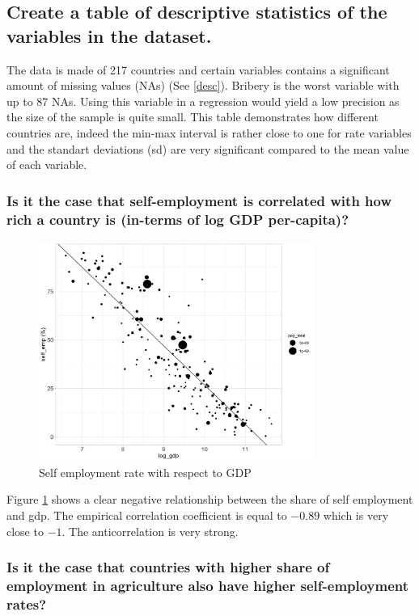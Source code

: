 \subsection{Create a table of descriptive statistics of the variables in the dataset.}


The data is made of 217 countries and certain variables contains a significant
amount of missing values (NAs) (See \ref{desc}). Bribery is the worst variable with up to 87 NAs. Using
this variable in a regression would yield a low precision as the size of the sample is quite small.
This table demonstrates how different countries are, indeed the min-max interval is rather close to one for rate variables and the standart deviations (sd)
are very significant compared to the mean value of each variable.

\subsubsection{Is it the case that self-employment is correlated with how rich a country is (in-terms of log GDP per-capita)?}


\begin{figure}[htbp]
  \centering
  \includegraphics[width=0.8\textwidth]{Exercise_1/OUTPUT/emp_wrt_gdp.png}
  \caption{Self employment rate with respect to GDP}
  \label{fig:emp_gdp}
\end{figure}


Figure \ref{fig:emp_gdp} shows a clear negative relationship between the share of self employment and gdp. The empirical correlation coefficient is equal to $-0.89$
which is very close to $-1$. The anticorrelation is very strong.
\subsubsection{Is it the case that countries with higher share of employment in agriculture also have higher self-employment rates?}

